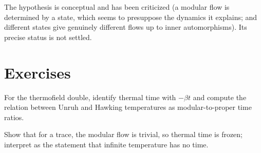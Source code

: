 \begin{whatwrong}
The hypothesis is conceptual and has been criticized (a modular flow is determined by a state, which seems to presuppose the dynamics it explains; and different states give genuinely different flows up to inner automorphisms). Its precise status is not settled.
\end{whatwrong}

\section*{Exercises}
\begin{exercise}
For the thermofield double, identify thermal time with $-\beta t$ and compute the relation between Unruh and Hawking temperatures as modular-to-proper time ratios.
\end{exercise}
\begin{exercise}
Show that for a trace, the modular flow is trivial, so thermal time is frozen; interpret as the statement that infinite temperature has no time.
\end{exercise}
